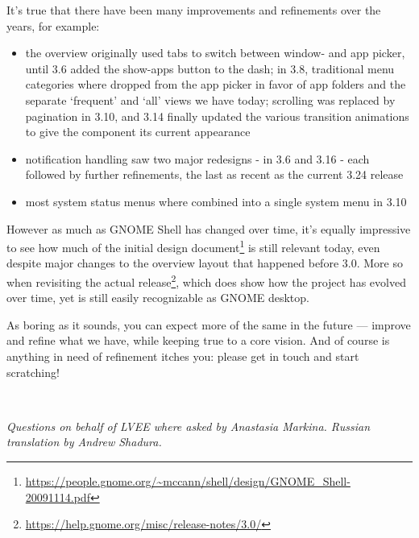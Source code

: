 \documentclass[10pt, a5paper]{article}
\begin{document}
\begin{Parallel}[p]{}{}
{\a It's true that there have been many improvements and refinements over the years, for example:
\begin{itemize}
\item the overview originally used tabs to switch between window- and
   app picker, until 3.6 added the show-apps button to the dash; in
   3.8, traditional menu categories where dropped from the app picker
   in favor of app folders and the separate ‘frequent’ and ‘all’ views
   we have today; scrolling was replaced by pagination in 3.10, and 3.14
   finally updated the various transition animations to give the component
   its current appearance

\item notification handling saw two major redesigns - in 3.6 and 3.16 - each
   followed by further refinements, the last as recent as the current 3.24
   release

\item most system status menus where combined into a single system menu in 3.10
\end{itemize}

However as much as GNOME Shell has changed over time, it's equally impressive to see how much of the initial design document\footnote{\url{https://people.gnome.org/~mccann/shell/design/GNOME\_Shell-20091114.pdf}} is still relevant today, even despite major changes to the overview layout that happened before 3.0. More so when revisiting the actual release\footnote{\url{https://help.gnome.org/misc/release-notes/3.0/}}, which does show how the project has evolved over time, yet is still easily recognizable as GNOME desktop.

As boring as it sounds, you can expect more of the same in the future --- improve and refine what we have, while keeping true to a core vision. And of course is anything in need of refinement itches you: please get in touch and start scratching!

~

\noindent \emph{Questions on behalf of LVEE where asked by Anastasia Markina. Russian translation by Andrew Shadura.}

\vfill
     }
\end{Parallel}
\end{document}
